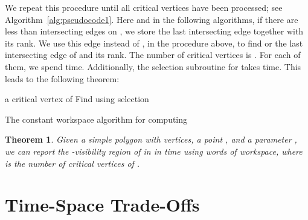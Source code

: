 \documentclass[11pt, a4paper]{article}
\newenvironment{alg}{
  \begin{algorithm}[htbp]
    \DontPrintSemicolon
    \SetKwInput{KwIn}{input}
    \SetKwInput{KwOut}{output}
  }{\end{algorithm}}
\newtheorem{thm}[theorem1]{Theorem}{\bfseries}{\itshape}
\begin{document}
We repeat this procedure until all critical vertices 
have been processed; see Algorithm~\ref{alg:pseudocode1}. 
Here and in the following algorithms, if there are 
less than  intersecting edges on , we store the 
last intersecting edge together with its rank.
We use this edge instead of
, in the procedure above, to find  or the
last intersecting edge of  and its rank.
The number of 
critical vertices is . For each of them, we spend
 time. Additionally, the selection subroutine for 
 takes  time. 
This leads to the following theorem:

\begin{alg}
  a critical vertex of \;
 Find  using selection\;
 \; 
 \caption{The constant workspace algorithm for computing
}\label{alg:pseudocode1}
\end{alg}


\begin{thm}\label{thm:constant-memory}
Given a simple polygon  with  vertices, a 
point , and a parameter , 
we can
report the -visibility region of  in  in  time using  
words of workspace, where  is the number of critical vertices of .
\end{thm}
\section{Time-Space Trade-Offs}
\end{document}
